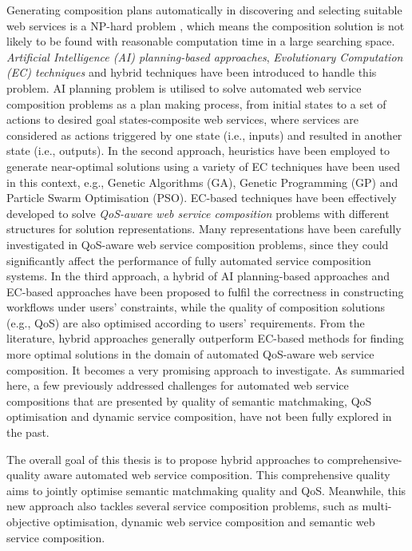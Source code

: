 Generating composition plans automatically in discovering and selecting suitable web services is a NP-hard problem \cite{moghaddam2014service}, which means the composition solution is not likely to be found with reasonable computation time in a large searching space. \emph{Artificial Intelligence (AI) planning-based approaches}, \emph{Evolutionary Computation (EC) techniques} and hybrid techniques have been introduced to handle this problem. AI planning problem is utilised to solve automated web service composition problems as a plan making process, from initial states to a set of actions to desired goal states-composite web services, where services are considered as actions triggered by one state (i.e., inputs) and resulted in another state (i.e., outputs). In the second approach, heuristics have been employed to generate near-optimal solutions using a variety of EC techniques have been used in this context, e.g., Genetic Algorithms (GA), Genetic Programming (GP) and Particle Swarm Optimisation (PSO). EC-based techniques have been effectively developed to solve \emph{QoS-aware web service composition} problems with different structures for solution representations. Many representations have been carefully investigated in QoS-aware web service composition problems, since they could significantly affect the performance of fully automated service composition systems. In the third approach, a hybrid of AI planning-based approaches and EC-based approaches \cite{da2016genetic,ma2015hybrid} have been proposed to fulfil the correctness in constructing workflows under users' constraints, while the quality of composition solutions (e.g., QoS) are also optimised according to users' requirements. From the literature, hybrid approaches generally outperform EC-based methods for finding more optimal solutions in the domain of automated QoS-aware web service composition. It becomes a very promising approach to investigate. As summaried here, a few previously addressed challenges for automated web service compositions that are presented by quality of semantic matchmaking, QoS optimisation and dynamic service composition, have not been fully explored in the past.

The overall goal of this thesis is to propose hybrid approaches to comprehensive-quality aware automated web service composition. This comprehensive quality aims to jointly optimise semantic matchmaking quality and QoS. Meanwhile, this new approach also tackles several service composition problems, such as multi-objective optimisation, dynamic web service composition and semantic web service composition.

